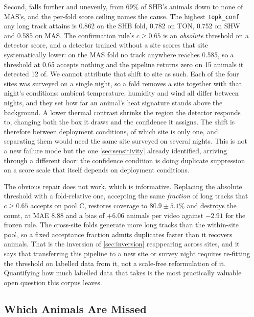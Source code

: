 Second, \countedq falls further and unevenly, from 69\% of SHB's animals down to none of
MAS's, and the per-fold score ceiling names the cause. The highest \texttt{topk\_conf} any long
track attains is 0.862 on the SHB fold, 0.782 on TON, 0.752 on SHW and 0.585 on MAS. The confirmation rule's
$c\ge0.65$ is an \emph{absolute} threshold on a detector score, and a detector trained without
a site scores that site systematically lower: on the MAS fold no track anywhere reaches 0.585,
so a threshold at 0.65 accepts nothing and the pipeline returns zero on 15 animals it detected
12 of. We cannot attribute that shift to site as such. Each of the four sites was surveyed on
a single night, so a fold removes a site together with that night's conditions: ambient
temperature, humidity and wind all differ between nights, and they set how far an animal's
heat signature stands above the background. A lower thermal contrast shrinks the region the
detector responds to, changing both the box it draws and the confidence it assigns. The shift
is therefore between deployment conditions, of which site is only one, and separating them
would need the same site surveyed on several nights. This is not a new failure mode but the one \cref{sec:sensitivity} already identified,
arriving through a different door: the confidence condition is doing duplicate suppression on
a score scale that itself depends on deployment conditions.

The obvious repair does not work, which is informative. Replacing the absolute threshold with a fold-relative one, accepting the same \emph{fraction} of long tracks that $c\ge0.65$ accepts on pool C, restores coverage to $80.9 \pm 5.1\%$ and destroys the count, at MAE 8.88 and a
bias of $+6.06$ animals per video against $-2.91$ for the frozen rule. The cross-site folds
generate more long tracks than the within-site pool, so a fixed acceptance fraction admits
duplicates faster than it recovers animals. That is the inversion of \cref{sec:inversion}
reappearing across sites, and it says that transferring this pipeline to a new site or survey night requires re-fitting the threshold on labelled data from it, not a scale-free reformulation of
it. Quantifying how much labelled data that takes is the most practically valuable open
question this corpus leaves.

\subsection{Which Animals Are Missed}
\label{sec:analysis}

